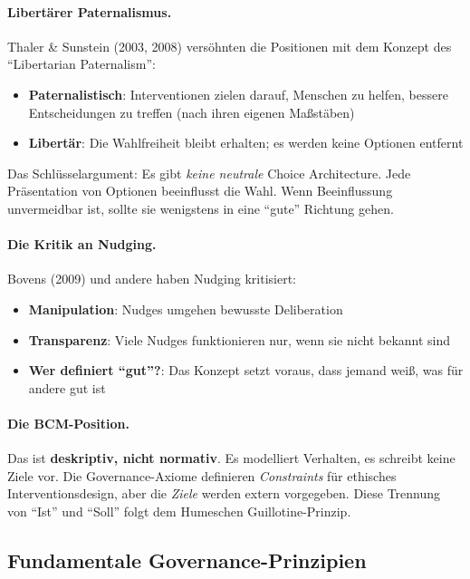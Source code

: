 \paragraph{Libertärer Paternalismus.}
Thaler \& Sunstein (2003, 2008) versöhnten die Positionen mit dem Konzept des ``Libertarian Paternalism'':
\begin{itemize}
    \item \textbf{Paternalistisch}: Interventionen zielen darauf, Menschen zu helfen, bessere Entscheidungen zu treffen (nach ihren eigenen Maßstäben)
    \item \textbf{Libertär}: Die Wahlfreiheit bleibt erhalten; es werden keine Optionen entfernt
\end{itemize}

Das Schlüsselargument: Es gibt \textit{keine neutrale} Choice Architecture. Jede Präsentation von Optionen beeinflusst die Wahl. Wenn Beeinflussung unvermeidbar ist, sollte sie wenigstens in eine ``gute'' Richtung gehen.

\paragraph{Die Kritik an Nudging.}
Bovens (2009) und andere haben Nudging kritisiert:
\begin{itemize}
    \item \textbf{Manipulation}: Nudges umgehen bewusste Deliberation
    \item \textbf{Transparenz}: Viele Nudges funktionieren nur, wenn sie nicht bekannt sind
    \item \textbf{Wer definiert ``gut''?}: Das Konzept setzt voraus, dass jemand weiß, was für andere gut ist
\end{itemize}

\paragraph{Die BCM-Position.}
Das \BCM{} ist \textbf{deskriptiv, nicht normativ}. Es modelliert Verhalten, es schreibt keine Ziele vor. Die Governance-Axiome definieren \textit{Constraints} für ethisches Interventionsdesign, aber die \textit{Ziele} werden extern vorgegeben. Diese Trennung von ``Ist'' und ``Soll'' folgt dem Humeschen Guillotine-Prinzip.

\subsection{Fundamentale Governance-Prinzipien}

